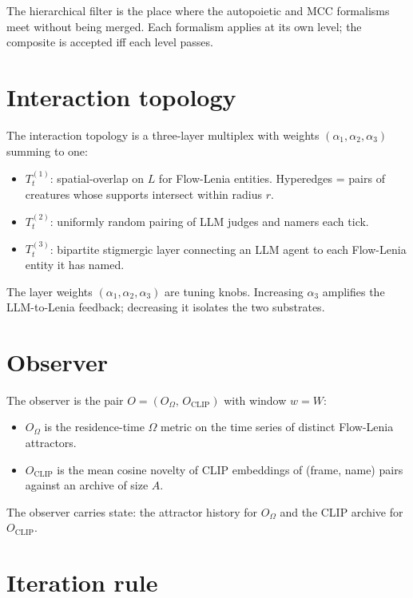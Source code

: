 The hierarchical filter is the place where the autopoietic and MCC
formalisms meet without being merged. Each formalism applies at its
own level; the composite is accepted iff each level passes.

\section{Interaction topology}

The interaction topology is a three-layer multiplex with weights
$(\alpha_1, \alpha_2, \alpha_3)$ summing to one:

\begin{itemize}[leftmargin=1.5em,itemsep=2pt]
  \item $T_t^{(1)}$: spatial-overlap on $L$ for Flow-Lenia entities.
    Hyperedges = pairs of creatures whose supports intersect within
    radius $r$.
  \item $T_t^{(2)}$: uniformly random pairing of LLM judges and
    namers each tick.
  \item $T_t^{(3)}$: bipartite stigmergic layer connecting an LLM
    agent to each Flow-Lenia entity it has named.
\end{itemize}

The layer weights $(\alpha_1, \alpha_2, \alpha_3)$ are tuning knobs.
Increasing $\alpha_3$ amplifies the LLM-to-Lenia feedback; decreasing
it isolates the two substrates.

\section{Observer}

The observer is the pair $O = (O_\Omega,\, O_{\mathrm{CLIP}})$ with
window $w = W$:

\begin{itemize}[leftmargin=1.5em,itemsep=2pt]
  \item $O_\Omega$ is the residence-time $\Omega$ metric on the time
    series of distinct Flow-Lenia attractors.
  \item $O_{\mathrm{CLIP}}$ is the mean cosine novelty of CLIP
    embeddings of (frame, name) pairs against an archive of size $A$.
\end{itemize}

The observer carries state: the attractor history for $O_\Omega$ and
the CLIP archive for $O_{\mathrm{CLIP}}$.

\section{Iteration rule}

